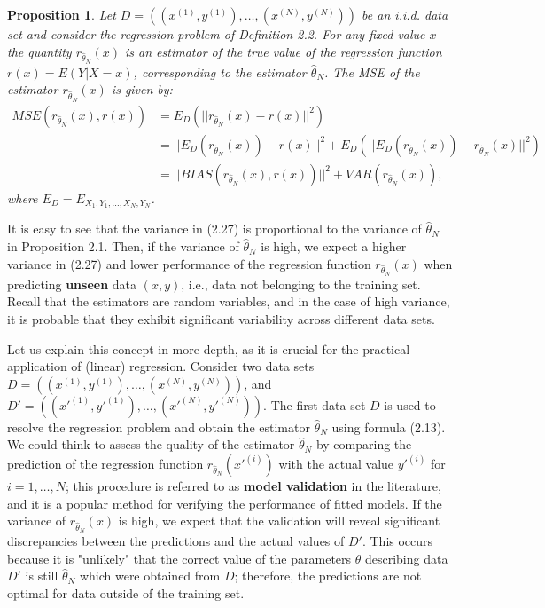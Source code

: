 \documentclass{report}
\newtheorem{proposition}{Proposition}[chapter]
\begin{document}
\begin{proposition}
Let $D = ((x^{(1)},y^{(1)}),\dots,(x^{(N)},y^{(N)}))$ be an i.i.d. data set and consider the regression problem of Definition 2.2. For any fixed value $x$ the quantity $r_{\hat{\theta}_N}(x)$ is an estimator of the true value of the regression function $r(x) = E(Y|X = x)$, corresponding to the estimator $\hat{\theta}_N$. The MSE of the estimator $r_{\hat{\theta}_N}(x)$ is given by:
\begin{equation}
\begin{split}
MSE(r_{\hat{\theta}_N}(x),r(x)) &= E_D(||r_{\hat{\theta}_N}(x) - r(x)||^2) \\ 
&=||E_D(r_{\hat{\theta}_N}(x)) - r(x)||^2+E_D(||E_D(r_{\hat{\theta}_N}(x)) - r_{\hat{\theta}_N}(x)||^2)\\
&=||BIAS(r_{\hat{\theta}_N}(x), r(x))||^2 + VAR(r_{\hat{\theta}_N}(x)),
\end{split}
\end{equation}
where $E_D = E_{X_1,Y_1,\dots,X_N,Y_N}$.
\end{proposition}
It is easy to see that the variance in (2.27) is proportional to the variance of $\hat{\theta}_N$ in Proposition 2.1. Then, if the variance of $\hat{\theta}_N$ is high, we expect a higher variance in (2.27) and lower performance of the regression function $r_{\hat{\theta}_N}(x)$ when predicting \textbf{unseen} data $(x,y)$, i.e., data not belonging to the training set. Recall that the estimators are random variables, and in the case of high variance, it is probable that they exhibit significant variability across different data sets.

Let us explain this concept in more depth, as it is crucial for the practical application of (linear) regression. Consider two data sets $D = ((x^{(1)},y^{(1)}),\dots,(x^{(N)},y^{(N)}))$, and $D' = ((x'^{(1)},y'^{(1)}),\dots,(x'^{(N)},y'^{(N)}))$. The first data set $D$ is used to resolve the regression problem and obtain the estimator $\hat{\theta}_N$ using formula (2.13). We could think to assess the quality of the estimator $\hat{\theta}_N$ by comparing the prediction of the regression function $r_{\hat{\theta}_N}(x'^{(i)})$ with the actual value $y'^{(i)}$ for $i = 1,\dots,N$; this procedure is referred to as \textbf{model validation} in the literature, and it is a popular method for verifying the performance of fitted models. If the variance of $r_{\hat{\theta}_N}(x)$ is high, we expect that the validation will reveal significant discrepancies between the predictions and the actual values of $D'$. This occurs because it is "unlikely" that the correct value of the parameters $\theta$ describing data $D'$ is still $\hat{\theta}_N$ which were obtained from $D$; therefore, the predictions are not optimal for data outside of the training set.
\end{document}
